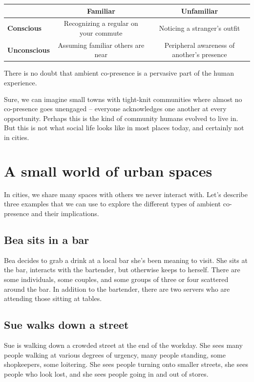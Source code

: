 \documentclass[12pt]{article}
\begin{document}
\vspace{1em}
\begin{table}[H]
\centering
\renewcommand{\arraystretch}{1.5}
\begin{tabular}{lcc}
\toprule
 & \textbf{Familiar} & \textbf{Unfamiliar} \\
\midrule
\textbf{Conscious} & Recognizing a regular on your commute & Noticing a stranger's outfit \\
\textbf{Unconscious} & Assuming familiar others are near & Peripheral awareness of another's presence \\
\bottomrule
\end{tabular}
\renewcommand{\arraystretch}{1.5}
\label{tab:types}
\end{table}


There is no doubt that ambient co-presence is a pervasive part of the human experience. 

Sure, we can imagine small towns with tight-knit communities where almost no co-presence goes unengaged -- everyone acknowledges one another at every opportunity. Perhaps this is the kind of community humans evolved to live in. But this is not what social life looks like in most places today, and certainly not in cities. 

\section{A small world of urban spaces}

In cities, we share many spaces with others we never interact with. Let's describe three examples that we can use to explore the different types of ambient co-presence and their implications.

\subsection{Bea sits in a bar}
Bea decides to grab a drink at a local bar she's been meaning to visit. She sits at the bar, interacts with the bartender, but otherwise keeps to herself. There are some individuals, some couples, and some groups of three or four scattered around the bar. In addition to the bartender, there are two servers who are attending those sitting at tables. 

\subsection{Sue walks down a street}
Sue is walking down a crowded street at the end of the workday. She sees many people walking at various degrees of urgency, many people standing, some shopkeepers, some loitering. She sees people turning onto smaller streets, she sees people who look lost, and she sees people going in and out of stores.
\end{document}
